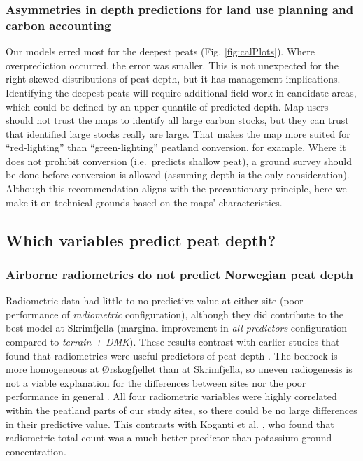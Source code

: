 \documentclass[soil, manuscript]{copernicus}
\begin{document}
\subsubsection{Asymmetries in depth predictions for land use planning and carbon accounting}

Our models erred most for the deepest peats (Fig. \ref{fig:calPlots}).
Where overprediction occurred, the error was smaller.
This is not unexpected for the right-skewed distributions of peat depth, but it has management implications.
Identifying the deepest peats will require additional field work in candidate areas, which could be defined by an upper quantile of predicted depth.
Map users should not trust the maps to identify all large carbon stocks, but they can trust that identified large stocks really are large.
That makes the map more suited for ``red-lighting'' than ``green-lighting'' peatland conversion, for example.
Where it does not prohibit conversion (i.e.~predicts shallow peat), a ground survey should be done before conversion is allowed (assuming depth is the only consideration).
Although this recommendation aligns with the precautionary principle, here we make it on technical grounds based on the maps' characteristics.

\subsection{Which variables predict peat depth?}

\subsubsection{Airborne radiometrics do not predict Norwegian peat depth}

Radiometric data had little to no predictive value at either site (poor performance of \emph{radiometric} configuration), although they did contribute to the best model at Skrimfjella (marginal improvement in \emph{all predictors} configuration compared to \emph{terrain + DMK}).
These results contrast with earlier studies that found that radiometrics were useful predictors of peat depth \citep{keaneySpatialStatisticsEstimate2013, gatisMappingUplandPeat2019, kogantiMappingPeatDepth2023}.
The bedrock is more homogeneous at Ørskogfjellet than at Skrimfjella, so uneven radiogenesis is not a viable explanation for the differences between sites nor the poor performance in general \citep{beamishEnvironmentalRadioactivityUK2014, reinhardtGammaraySpectrometryVersatile2019}.
All four radiometric variables were highly correlated within the peatland parts of our study sites, so there could be no large differences in their predictive value.
This contrasts with Koganti et al. \citeyearpar{kogantiMappingPeatDepth2023}, who found that radiometric total count was a much better predictor than potassium ground concentration.
\end{document}
